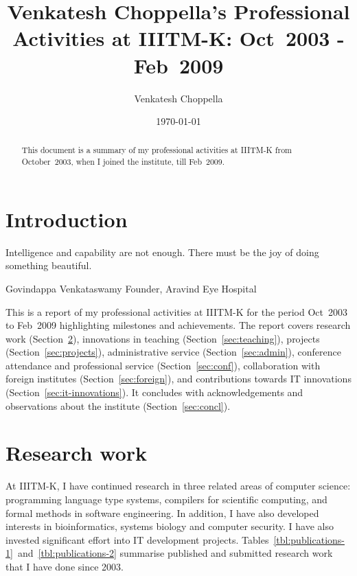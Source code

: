 \documentclass[titlepage, %
11pt, 
]{article}
\begin{document}
\title{Venkatesh Choppella's Professional Activities at
  IIITM-K: Oct~2003 - Feb~2009}
\author{Venkatesh Choppella}
\date{\today}

\maketitle

\begin{abstract}
  This document is a summary of my professional activities
  at IIITM-K from October~2003, when I joined the institute,
  till Feb~2009.
\end{abstract}

\tableofcontents
\newpage
\listoftables
\newpage
\section{Introduction}
\label{sec:introduction}


\epigraph {Intelligence and capability are not enough. There
  must be the joy of doing something beautiful.}{{\sc
    Govindappa Venkataswamy} Founder, Aravind Eye Hospital}

This is a report of my professional activities at IIITM-K
for the period Oct~2003 to Feb~2009 highlighting milestones
and achievements.  The report covers research work
(Section~\ref{sec:research-work}), innovations in teaching
(Section~\ref{sec:teaching}), projects
(Section~\ref{sec:projects}), administrative service
(Section~\ref{sec:admin}), conference attendance and
professional service (Section~\ref{sec:conf}), collaboration
with foreign institutes (Section~\ref{sec:foreign}), and
contributions towards IT innovations
(Section~\ref{sec:it-innovations}).  It concludes with
acknowledgements and observations about the institute
(Section~\ref{sec:concl}).
\section{Research work}
\label{sec:research-work}
At IIITM-K, I have continued research in three related areas
of computer science: programming language type systems,
compilers for scientific computing, and formal methods in
software engineering.  In addition, I have also developed
interests in bioinformatics, systems biology and computer
security.  I have also invested significant effort into IT
development projects.
Tables~\ref{tbl:publications-1}~and~\ref{tbl:publications-2}
summarise published and submitted research work that I have
done since 2003. 
\end{document}
